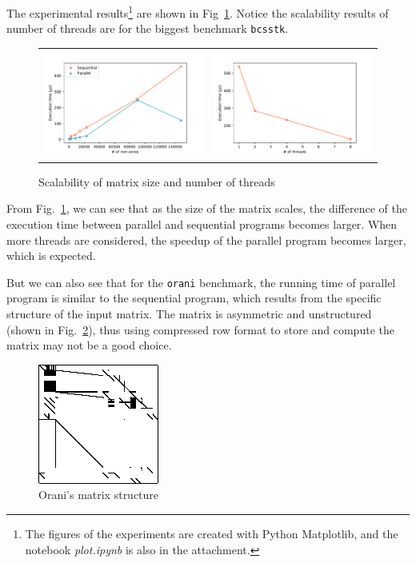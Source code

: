 \documentclass[english]{thesis}
\begin{document}
The experimental results\footnote{The figures of the experiments are created with Python Matplotlib, and the notebook \textit{plot.ipynb} is also in the attachment.} are shown in Fig~\ref{fig:scalability}.
Notice the scalability results of number of threads are for the biggest benchmark \verb'bcsstk'.
\begin{figure}[H]
\centering
\begin{tabular}{cc}
\includegraphics[width=0.5\linewidth]{fig/size.pdf}&
\includegraphics[width=0.5\linewidth]{fig/worker.pdf}
\end{tabular}
\caption{Scalability of matrix size and number of threads}
\label{fig:scalability}
\end{figure}

From Fig.~\ref{fig:scalability}, we can see that as the size of the matrix scales, the difference of the execution time between parallel and sequential programs becomes larger.
When more threads are considered, the speedup of the parallel program becomes larger, which is expected.

But we can also see that for the \verb'orani' benchmark, the running time of parallel program is similar to the sequential program, which results from the specific structure of the input matrix.
The matrix is asymmetric and unstructured (shown in Fig.~\ref{fig:orani}), thus using compressed row format to store and compute the matrix may not be a good choice.
\begin{figure}[H]
\centering
\includegraphics[width=0.3\linewidth]{fig/orani678.png}
\caption{Orani's matrix structure}
\label{fig:orani}
\end{figure}
\end{document}
